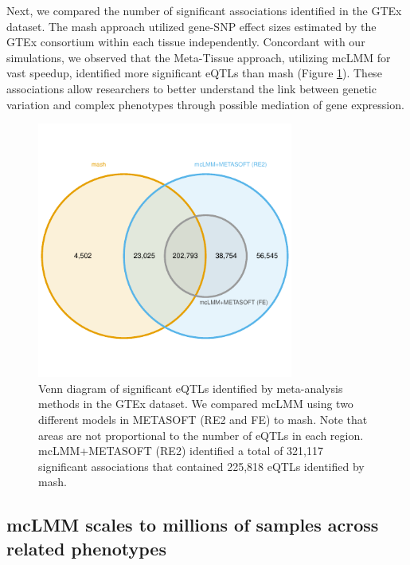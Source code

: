         Next, we compared the number of significant associations identified in the GTEx dataset. The mash approach utilized gene-SNP effect sizes estimated by the GTEx consortium within each tissue independently. Concordant with our simulations, we observed that the Meta-Tissue approach, utilizing mcLMM for vast speedup, identified more significant eQTLs than mash (Figure \ref{fig:fig5}). These associations allow researchers to better understand the link between genetic variation and complex phenotypes through possible mediation of gene expression. 
        
        \begin{figure}
            \centering
            \includegraphics[width=0.75\textwidth]{chapter3/figures/Figure_5.pdf}
            \caption{Venn diagram of significant eQTLs identified by meta-analysis methods in the GTEx dataset. We compared mcLMM using two different models in METASOFT (RE2 and FE) to mash. Note that areas are not proportional to the number of eQTLs in each region. mcLMM+METASOFT (RE2) identified a total of 321,117 significant associations that contained 225,818 eQTLs identified by mash.}
            \label{fig:fig5}
        \end{figure}
        
    \subsection{mcLMM scales to millions of samples across related phenotypes}
    
